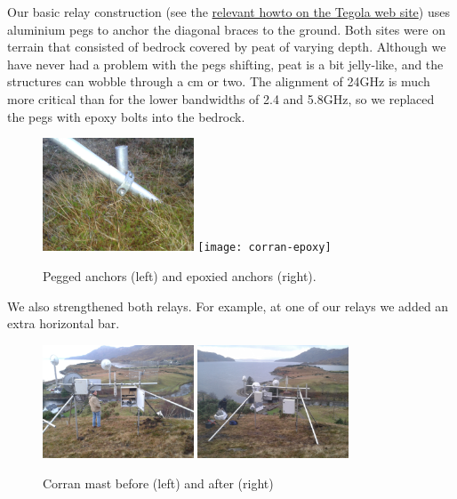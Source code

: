 Our basic relay construction (see the
\href{http://www.tegola.org.uk/howto/relay-construction.html}{relevant
  howto on the Tegola web site}) uses aluminium pegs to anchor the
diagonal braces to the ground. Both sites were on terrain that
consisted of bedrock covered by peat of varying depth. Although we
have never had a problem with the pegs shifting, peat is a bit
jelly-like, and the structures can wobble through a cm or two. The
alignment of 24GHz is much more critical than for the lower bandwidths
of 2.4 and 5.8GHz, so we replaced the pegs with epoxy bolts into the
bedrock.
\begin{figure}[h]
\includegraphics[width=0.4\textwidth]{corran-peg}
\texttt{[image: corran-epoxy]}
\caption{Pegged anchors (left) and epoxied anchors (right).}
\end{figure}

We also strengthened both relays. For example, at one of our relays we
added an extra horizontal bar.

\begin{figure}[h]
\includegraphics[width=0.4\textwidth]{corran-before-from-behind}
\includegraphics[width=0.4\textwidth]{corran-after-from-behind}
\caption{Corran mast before (left) and after (right)}
\end{figure}

